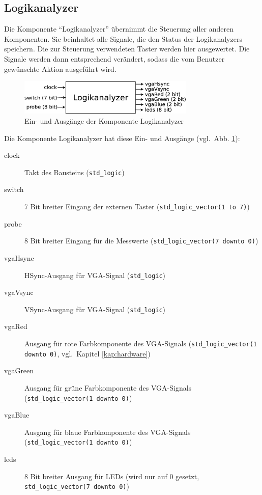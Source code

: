 \documentclass[IN,ngerman,utf8,12pt]{tumbook}
\newcommand{\vgl}{vgl.\ }
\begin{document}
\subsection{Logikanalyzer}
Die Komponente ``Logikanalyzer'' übernimmt die Steuerung aller anderen Komponenten.
Sie beinhaltet alle Signale, die den Status der Logikanalyzers speichern.
Die zur Steuerung verwendeten Taster werden hier ausgewertet.
Die Signale werden dann entsprechend verändert, sodass die vom Benutzer gewünschte Aktion ausgeführt wird.

\begin{figure}[H]
    \centerline{
        \includegraphics[width=0.75\textwidth]{img/logikanalyzer}
    }
    \label{abb:logikanalyzer}
    \caption{Ein- und Ausgänge der Komponente Logikanalyzer}
\end{figure}

Die Komponente Logikanalyzer hat diese Ein- und Ausgänge (\vgl Abb. \ref{abb:logikanalyzer}):
\begin{description}
    \item[clock] Takt des Bausteins (\texttt{std\_logic})
    \item[switch] 7 Bit breiter Eingang der externen Taster (\texttt{std\_logic\_vector(1 to 7)})
    \item[probe] 8 Bit breiter Eingang für die Messwerte (\texttt{std\_logic\_vector(7 downto 0)})
    \item[vgaHsync] HSync-Ausgang für VGA-Signal (\texttt{std\_logic})
    \item[vgaVsync] VSync-Ausgang für VGA-Signal (\texttt{std\_logic})
    \item[vgaRed] Ausgang für rote Farbkomponente des VGA-Signals (\texttt{std\_logic\_vector(1 downto 0)}, \vgl Kapitel \ref{kap:hardware})
    \item[vgaGreen] Ausgang für grüne Farbkomponente des VGA-Signals (\texttt{std\_logic\_vector(1 downto 0)})
    \item[vgaBlue] Ausgang für blaue Farbkomponente des VGA-Signals (\texttt{std\_logic\_vector(1 downto 0)})
    \item[leds] 8 Bit breiter Ausgang für LEDs (wird nur auf 0 gesetzt, \texttt{std\_logic\_vector(7 downto 0)})
\end{description}
\end{document}
